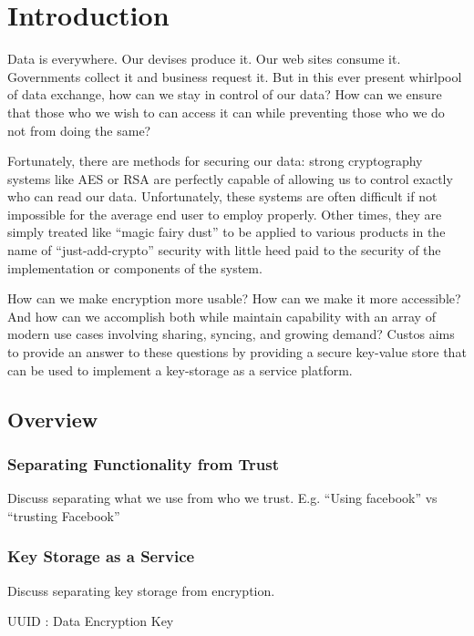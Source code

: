\chapter{Introduction}
\label{chap:intro}

Data is everywhere. Our devises produce it. Our web sites consume
it. Governments collect it and business request it. But in this ever
present whirlpool of data exchange, how can we stay in control of our
data? How can we ensure that those who we wish to can access it can
while preventing those who we do not from doing the same?

Fortunately, there are methods for securing our data: strong
cryptography systems like AES or RSA are perfectly capable of allowing
us to control exactly who can read our data. Unfortunately, these systems
are often difficult if not impossible for the average end user to
employ properly. Other times, they are simply treated like ``magic
fairy dust'' to be applied to various products in the name of
``just-add-crypto'' security with little heed paid to the security of
the implementation or components of the system.

How can we make encryption more usable? How can we make it more
accessible? And how can we accomplish both while maintain capability
with an array of modern use cases involving sharing, syncing, and
growing demand? Custos aims to provide an answer to these questions by
providing a secure key-value store that can be used to implement a
key-storage as a service platform.

\section{Overview}



\subsection{Separating Functionality from Trust}

Discuss separating what we use from who we trust. E.g. ``Using
facebook'' vs ``trusting Facebook''

\subsection{Key Storage as a Service}

Discuss separating key storage from encryption.

UUID : Data Encryption Key

